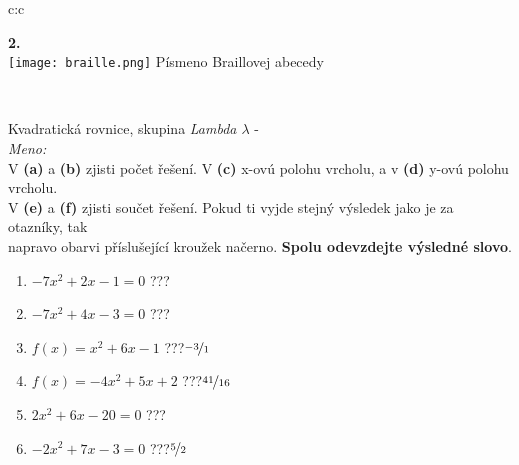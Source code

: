 \documentclass[10pt]{report}
\begin{document}
\begin{tabular}{c:c}
\begin{minipage}[c][99mm][t]{0.49\linewidth}
\begin{center}
\begin{minipage}{0.20\linewidth}
\begin{center}
{\Huge\bfseries 2.} \\[2mm]
\texttt{[image: braille.png]}
{\small Písmeno Braillovej abecedy}
\end{center}
\end{minipage}
\end{center}
\end{minipage}
\\ \hdashline
\begin{minipage}[c][99mm][t]{0.49\linewidth}
\begin{center}
\vspace{7mm}
{\huge Kvadratická rovnice, skupina \textit{Lambda $\lambda$} -}\\[4.5mm]
\textit{Meno:}\phantom{xxxxxxxxxxxxxxxxxxxxxxxxxxxxxxxxxxxxxxxxxxxxxxxxxxxxxxxxxxxxxxxxx}\\[3.5mm]
V \textbf{(a)} a \textbf{(b)} zjisti počet řešení. V \textbf{(c)} x-ovú polohu vrcholu, a v \textbf{(d)} y-ovú polohu vrcholu.\\V \textbf{(e)} a \textbf{(f)} zjisti součet řešení. Pokud ti vyjde stejný výsledek jako je za otazníky, tak\\napravo obarvi příslušející kroužek načerno. \textbf{Spolu odevzdejte výsledné slovo}.\\[3mm]
\begin{minipage}{0.77\linewidth}
\begin{center}
\begin{varwidth}{\textwidth}
\begin{enumerate}
\large
\item $-7x^2+2x-1=0$\quad \dotfill\; ???\;\dotfill {}
\item $-7x^2+4x-3=0$\quad \dotfill\; ???\;\dotfill {}
\item $f(x)=x^2+6x-1$\quad \dotfill\; ???\;\dotfill \quad $\nicefrac{-3}{1}$
\item $f(x)=-4x^2+5x+2$\quad \dotfill\; ???\;\dotfill \quad $\nicefrac{41}{16}$
\item $2x^2+6x-20=0$\quad \dotfill\; ???\;\dotfill {}
\item $-2x^2+7x-3=0$\quad \dotfill\; ???\;\dotfill \quad $\nicefrac{5}{2}$
\end{enumerate}
\end{varwidth}
\end{center}
\end{minipage}
\begin{minipage}{0.20\linewidth}
\begin{center}

\end{center}
\end{minipage}
\end{center}
\end{minipage}
\end{tabular}
\end{document}
